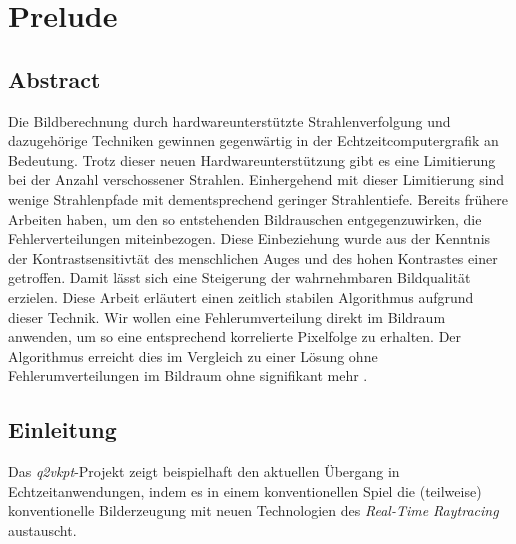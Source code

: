 \newcommand{\uproman}[1]{\uppercase\expandafter{\romannumeral#1}}
\newcommand{\lowroman}[1]{\romannumeral#1\relax}

\chapter{Prelude}
\label{ch:Introduction}

\section{Abstract}

\vspace*{\fill}

Die Bildberechnung durch hardwareunterstützte Strahlenverfolgung und dazugehörige Techniken gewinnen gegenwärtig in der Echtzeitcomputergrafik an Bedeutung. 
Trotz dieser neuen Hardwareunterstützung gibt es eine Limitierung bei der Anzahl verschossener Strahlen. Einhergehend mit dieser Limitierung sind 
wenige Strahlenpfade mit dementsprechend geringer Strahlentiefe. Bereits frühere Arbeiten haben, um den so entstehenden Bildrauschen entgegenzuwirken,
die  Fehlerverteilungen miteinbezogen. Diese Einbeziehung wurde aus der Kenntnis der Kontrastsensitivtät des menschlichen Auges
und des hohen Kontrastes einer  getroffen. Damit lässt sich eine Steigerung der wahrnehmbaren Bildqualität erzielen.
Diese Arbeit erläutert einen zeitlich stabilen Algorithmus aufgrund dieser Technik. Wir wollen eine Fehlerumverteilung direkt im Bildraum anwenden, um so eine entsprechend 
korrelierte Pixelfolge zu erhalten. Der Algorithmus erreicht dies im Vergleich zu einer Lösung ohne Fehlerumverteilungen im Bildraum ohne signifikant mehr
.
\vfill

\newpage

\section{Einleitung}
\vspace*{\fill}

Das \textit{q2vkpt}-Projekt \cite{Sch19} zeigt beispielhaft den aktuellen Übergang in Echtzeitanwendungen, indem es in einem konventionellen Spiel die (teilweise) konventionelle Bilderzeugung 
mit neuen Technologien des \textit{Real-Time Raytracing} austauscht.

